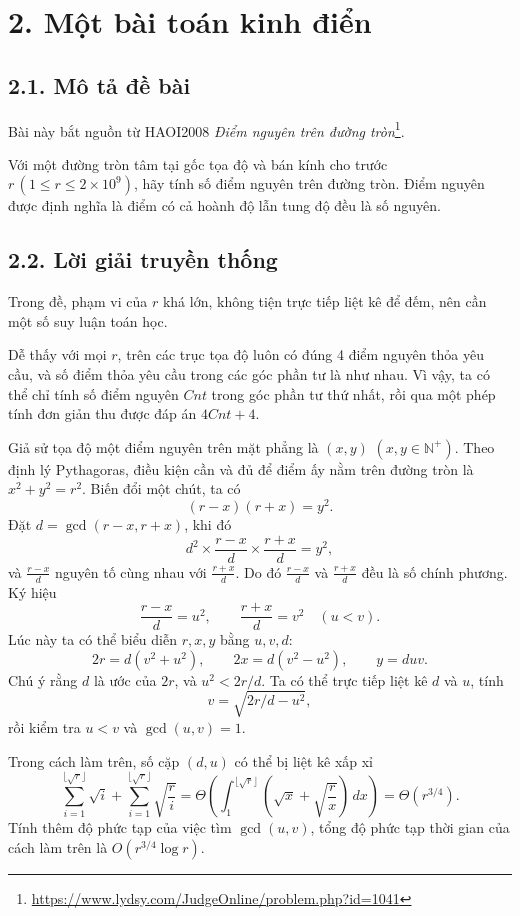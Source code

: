 \documentclass[11pt]{article}
\begin{document}
\section*{2. Một bài toán kinh điển}

\subsection*{2.1. Mô tả đề bài}

Bài này bắt nguồn từ HAOI2008 \emph{Điểm nguyên trên đường tròn}\footnote{\url{https://www.lydsy.com/JudgeOnline/problem.php?id=1041}}.

Với một đường tròn tâm tại gốc tọa độ và bán kính cho trước
\(r\,(1\le r\le 2\times10^9)\), hãy tính số điểm nguyên trên đường tròn. Điểm
nguyên được định nghĩa là điểm có cả hoành độ lẫn tung độ đều là số nguyên.

\subsection*{2.2. Lời giải truyền thống}

Trong đề, phạm vi của \(r\) khá lớn, không tiện trực tiếp liệt kê để đếm, nên
cần một số suy luận toán học.

Dễ thấy với mọi \(r\), trên các trục tọa độ luôn có đúng 4 điểm nguyên thỏa
yêu cầu, và số điểm thỏa yêu cầu trong các góc phần tư là như nhau. Vì vậy,
ta có thể chỉ tính số điểm nguyên \(Cnt\) trong góc phần tư thứ nhất, rồi qua
một phép tính đơn giản thu được đáp án \(4Cnt+4\).

Giả sử tọa độ một điểm nguyên trên mặt phẳng là \((x,y)\)
\((x,y\in\mathbb N^+)\). Theo định lý Pythagoras, điều kiện cần và đủ để điểm
ấy nằm trên đường tròn là \(x^2+y^2=r^2\). Biến đổi một chút, ta có
\[
  (r-x)(r+x)=y^2.
\]
Đặt \(d=\gcd(r-x,r+x)\), khi đó
\[
  d^2\times\frac{r-x}{d}\times\frac{r+x}{d}=y^2,
\]
và \(\frac{r-x}{d}\) nguyên tố cùng nhau với \(\frac{r+x}{d}\). Do đó
\(\frac{r-x}{d}\) và \(\frac{r+x}{d}\) đều là số chính phương. Ký hiệu
\[
  \frac{r-x}{d}=u^2,\qquad \frac{r+x}{d}=v^2\quad (u<v).
\]
Lúc này ta có thể biểu diễn \(r,x,y\) bằng \(u,v,d\):
\[
  2r=d(v^2+u^2),\qquad 2x=d(v^2-u^2),\qquad y=duv.
\]
Chú ý rằng \(d\) là ước của \(2r\), và \(u^2<2r/d\). Ta có thể trực tiếp liệt
kê \(d\) và \(u\), tính
\[
  v=\sqrt{2r/d-u^2},
\]
rồi kiểm tra \(u<v\) và \(\gcd(u,v)=1\).

Trong cách làm trên, số cặp \((d,u)\) có thể bị liệt kê xấp xỉ
\[
  \sum_{i=1}^{\lfloor\sqrt r\rfloor}\sqrt{i}
  +\sum_{i=1}^{\lfloor\sqrt r\rfloor}\sqrt{\frac ri}
  =
  \Theta\left(\int_1^{\lfloor\sqrt r\rfloor}
    \left(\sqrt x+\sqrt{\frac rx}\right)\,dx\right)
  =\Theta(r^{3/4}).
\]
Tính thêm độ phức tạp của việc tìm \(\gcd(u,v)\), tổng độ phức tạp thời gian
của cách làm trên là \(O(r^{3/4}\log r)\).
\end{document}
